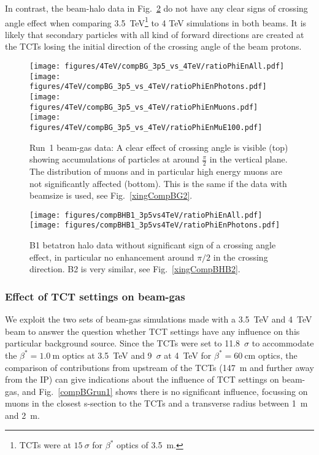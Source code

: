 In contrast, the beam-halo data in Fig.~\ref{xingCompBHB1} do not have any clear signs of crossing angle effect when comparing 3.5~TeV\footnote{TCTs were at $15~\sigma$ for $\beta^*$ optics of 3.5~m.} to 4 TeV simulations in both beams. It is likely that secondary particles with all kind of forward directions are created at the TCTs losing the initial direction of the crossing angle of the beam protons.

\begin{figure}
\begin{center}
  \texttt{[image: figures/4TeV/compBG\_3p5\_vs\_4TeV/ratioPhiEnAll.pdf]}
  \texttt{[image: figures/4TeV/compBG\_3p5\_vs\_4TeV/ratioPhiEnPhotons.pdf]}
  \texttt{[image: figures/4TeV/compBG\_3p5\_vs\_4TeV/ratioPhiEnMuons.pdf]}
  \texttt{[image: figures/4TeV/compBG\_3p5\_vs\_4TeV/ratioPhiEnMuE100.pdf]}
\end{center}
\vspace{-0.6cm}
 \caption{Run~1 beam-gas data: A clear effect of crossing angle is visible (top) showing accumulations of particles at around $\frac{\pi}{2}$ in the vertical plane. The distribution of muons and in particular high energy muons are not significantly affected (bottom). This is the same if the data with beamsize is used, see Fig.~\ref{xingCompBG2}.
  \label{xingCompBG}}
\end{figure}


\begin{figure}
\centering
    \texttt{[image: figures/compBHB1\_3p5vs4TeV/ratioPhiEnAll.pdf]}
    \texttt{[image: figures/compBHB1\_3p5vs4TeV/ratioPhiEnPhotons.pdf]}
    \caption{B1 betatron halo data without significant sign of a crossing angle effect, in particular no enhancement around $\pi/2$ in the crossing direction. B2 is very similar, see Fig.~\ref{xingCompBHB2}.
      \label{xingCompBHB1}
      }
\end{figure}

\subsubsection{Effect of TCT settings on beam-gas}

We exploit the two sets of beam-gas simulations made with a 3.5~TeV and 4~TeV beam to answer the question whether TCT settings have any influence on this particular background source. Since the TCTs were set to 11.8~$\sigma$ to accommodate the $\beta^* = 1.0~$m optics at 3.5~TeV and 9~$\sigma$ at 4~TeV for $\beta^* = 60~$cm optics, the comparison of contributions from upstream of the TCTs (147~m and further away from the IP) can give indications about the influence of TCT settings on beam-gas, and Fig.~\ref{compBGrun1} shows there is no significant influence, focussing on muons in the closest s-section to the TCTs and a transverse radius between 1~m and 2~m. 

